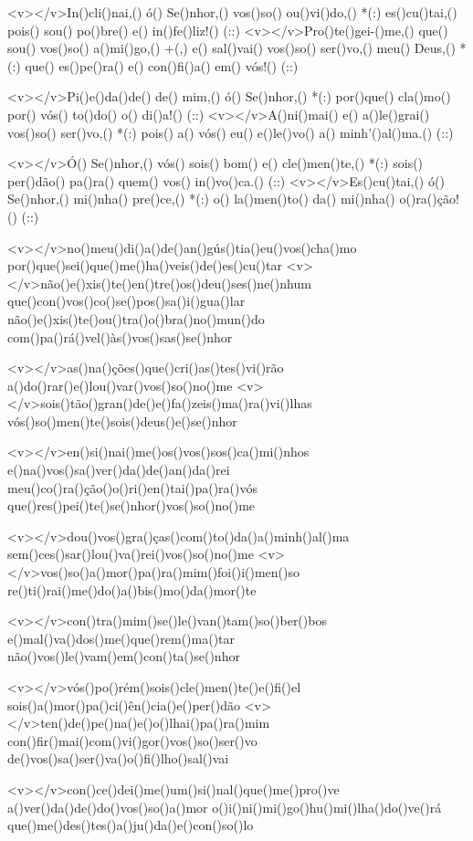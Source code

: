<v></v>In()cli()nai,() ó() Se()nhor,() vos()so() ou()vi()do,() *(:)
es()cu()tai,() pois() sou() po()bre() e() in()fe()liz!() (::)
<v></v>Pro()te()gei-()me,() que() sou() vos()so() a()mi()go,() +(,)
e() sal()vai() vos()so() ser()vo,() meu() Deus,() *(:)
que() es()pe()ra() e() con()fi()a() em() vós!() (::)

<v></v>Pi()e()da()de() de() mim,() ó() Se()nhor,() *(:)
por()que() cla()mo() por() vós() to()do() o() di()a!() (::)
<v></v>A()ni()mai() e() a()le()grai() vos()so() ser()vo,() *(:)
pois() a() vós() eu() e()le()vo() a() minh'()al()ma.() (::)

<v></v>Ó() Se()nhor,() vós() sois() bom() e() cle()men()te,() *(:)
sois() per()dão() pa()ra() quem() vos() in()vo()ca.() (::)
<v></v>Es()cu()tai,() ó() Se()nhor,() mi()nha() pre()ce,() *(:)
o() la()men()to() da() mi()nha() o()ra()ção!() (::)

<v></v>no()meu()di()a()de()an()gús()tia()eu()vos()cha()mo
por()que()sei()que()me()ha()veis()de()es()cu()tar
<v></v>não()e()xis()te()en()tre()os()deu()ses()ne()nhum
que()con()vos()co()se()pos()sa()i()gua()lar
não()e()xis()te()ou()tra()o()bra()no()mun()do
com()pa()rá()vel()às()vos()sas()se()nhor

<v></v>as()na()ções()que()cri()as()tes()vi()rão
a()do()rar()e()lou()var()vos()so()no()me
<v></v>sois()tão()gran()de()e()fa()zeis()ma()ra()vi()lhas
vós()so()men()te()sois()deus()e()se()nhor

<v></v>en()si()nai()me()os()vos()sos()ca()mi()nhos
e()na()vos()sa()ver()da()de()an()da()rei
meu()co()ra()ção()o()ri()en()tai()pa()ra()vós
que()res()pei()te()se()nhor()vos()so()no()me

<v></v>dou()vos()gra()ças()com()to()da()a()minh()al()ma
sem()ces()sar()lou()va()rei()vos()so()no()me
<v></v>vos()so()a()mor()pa()ra()mim()foi()i()men()so
re()ti()rai()me()do()a()bis()mo()da()mor()te

<v></v>con()tra()mim()se()le()van()tam()so()ber()bos
e()mal()va()dos()me()que()rem()ma()tar
não()vos()le()vam()em()con()ta()se()nhor

<v></v>vós()po()rém()sois()cle()men()te()e()fi()el
sois()a()mor()pa()ci()ên()cia()e()per()dão
<v></v>ten()de()pe()na()e()o()lhai()pa()ra()mim
con()fir()mai()com()vi()gor()vos()so()ser()vo
de()vos()sa()ser()va()o()fi()lho()sal()vai

<v></v>con()ce()dei()me()um()si()nal()que()me()pro()ve
a()ver()da()de()do()vos()so()a()mor
o()i()ni()mi()go()hu()mi()lha()do()ve()rá
que()me()des()tes()a()ju()da()e()con()so()lo